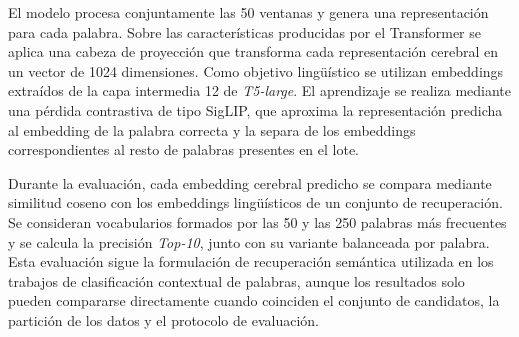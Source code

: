 El modelo procesa conjuntamente las 50 ventanas y genera una representación para cada palabra. Sobre las características producidas por el Transformer se aplica una cabeza de proyección que transforma cada representación cerebral en un vector de 1024 dimensiones. Como objetivo lingüístico se utilizan embeddings extraídos de la capa intermedia 12 de \textit{T5-large}. El aprendizaje se realiza mediante una pérdida contrastiva de tipo SigLIP, que aproxima la representación predicha al embedding de la palabra correcta y la separa de los embeddings correspondientes al resto de palabras presentes en el lote.

Durante la evaluación, cada embedding cerebral predicho se compara mediante similitud coseno con los embeddings lingüísticos de un conjunto de recuperación. Se consideran vocabularios formados por las 50 y las 250 palabras más frecuentes y se calcula la precisión \textit{Top-10}, junto con su variante balanceada por palabra. Esta evaluación sigue la formulación de recuperación semántica utilizada en los trabajos de clasificación contextual de palabras, aunque los resultados solo pueden compararse directamente cuando coinciden el conjunto de candidatos, la partición de los datos y el protocolo de evaluación.



